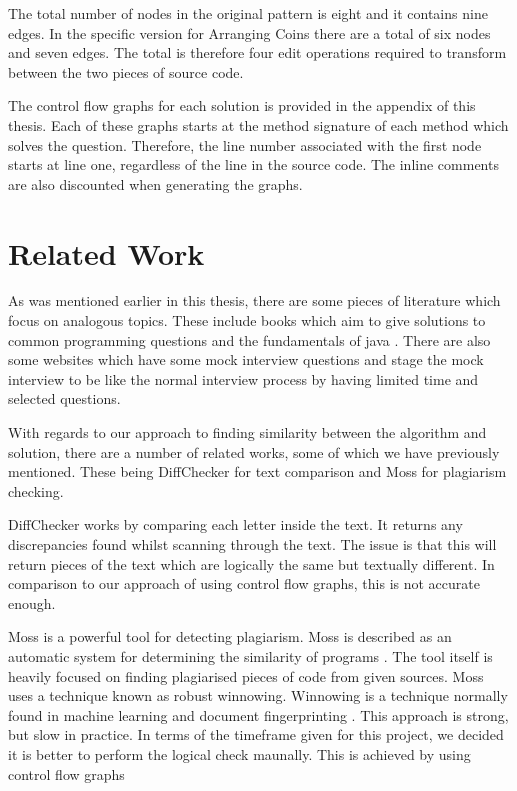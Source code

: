 \documentclass[10pt,twocolumn,hidelinks]{IEEEtran}
\begin{document}
\par The total number of nodes in the original pattern is eight and it contains nine edges. In the specific version for Arranging Coins there are a total of six nodes and seven edges. The total is therefore four edit operations required to transform between the two pieces of source code. 
\par The control flow graphs for each solution is provided in the appendix of this thesis. Each of these graphs starts at the method signature of each method which solves the question. Therefore, the line number associated with the first node starts at line one, regardless of the line in the source code. The inline comments are also discounted when generating the graphs.
\section{Related Work}
As was mentioned earlier in this thesis, there are some pieces of literature which focus on analogous topics. These include books which aim to give solutions to common programming questions \cite{mcdowell2015cracking} and the fundamentals of java \cite{markham2014java}\cite{aziz2012elements}. There are also some websites which have some mock interview questions and stage the mock interview to be like the normal interview process by having limited time and selected questions.
\par With regards to our approach to finding similarity between the algorithm and solution, there are a number of related works, some of which we have previously mentioned. These being DiffChecker for text comparison and Moss for plagiarism checking. 
\par DiffChecker works by comparing each letter inside the text. It returns any discrepancies found whilst scanning through the text. The issue is that this will return pieces of the text which are logically the same but textually different. In comparison to our approach of using control flow graphs, this is not accurate enough. 
\par Moss is a powerful tool for detecting plagiarism. Moss is described as an automatic system for determining the similarity of programs \cite{mosswebsite}. The tool itself is heavily focused on finding plagiarised pieces of code from given sources. Moss uses a technique known as robust winnowing. Winnowing is a technique normally found in machine learning and document fingerprinting \cite{Schleimer:2003:WLA:872757.872770}. This approach is strong, but slow in practice. In terms of the timeframe given for this project, we decided it is better to perform the logical check maunally. This is achieved by using control flow graphs
\end{document}
